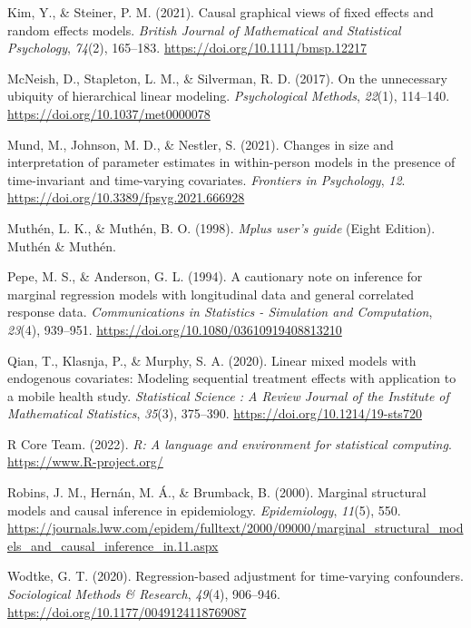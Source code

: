 \documentclass[
  12pt,
  a4paper,
]{article}
\newlength{\cslhangindent}
\newlength{\cslentryspacingunit} %
\newenvironment{CSLReferences}[2] %
 {%
  \setlength{\parindent}{0pt}
  \ifodd #1
  \let\oldpar\par
  \def\par{\hangindent=\cslhangindent\oldpar}
  \fi
  \setlength{\parskip}{#2\cslentryspacingunit}
 }%
 {}
\begin{document}
\begin{CSLReferences}{1}{0}
\leavevmode{}%
Kim, Y., \& Steiner, P. M. (2021). Causal graphical views of fixed
effects and random effects models. \emph{British Journal of Mathematical
and Statistical Psychology}, \emph{74}(2), 165--183.
\url{https://doi.org/10.1111/bmsp.12217}

\leavevmode{}%
McNeish, D., Stapleton, L. M., \& Silverman, R. D. (2017). On the
unnecessary ubiquity of hierarchical linear modeling.
\emph{Psychological Methods}, \emph{22}(1), 114--140.
\url{https://doi.org/10.1037/met0000078}

\leavevmode{}%
Mund, M., Johnson, M. D., \& Nestler, S. (2021). Changes in size and
interpretation of parameter estimates in within-person models in the
presence of time-invariant and time-varying covariates. \emph{Frontiers
in Psychology}, \emph{12}.
\url{https://doi.org/10.3389/fpsyg.2021.666928}

\leavevmode{}%
Muthén, L. K., \& Muthén, B. O. (1998). \emph{Mplus user's guide} (Eight
Edition). Muthén \& Muthén.

\leavevmode{}%
Pepe, M. S., \& Anderson, G. L. (1994). A cautionary note on inference
for marginal regression models with longitudinal data and general
correlated response data. \emph{Communications in Statistics -
Simulation and Computation}, \emph{23}(4), 939--951.
\url{https://doi.org/10.1080/03610919408813210}

\leavevmode{}%
Qian, T., Klasnja, P., \& Murphy, S. A. (2020). Linear mixed models with
endogenous covariates: Modeling sequential treatment effects with
application to a mobile health study. \emph{Statistical Science : A
Review Journal of the Institute of Mathematical Statistics},
\emph{35}(3), 375--390. \url{https://doi.org/10.1214/19-sts720}

\leavevmode{}%
R Core Team. (2022). \emph{R: A language and environment for statistical
computing}. \url{https://www.R-project.org/}

\leavevmode{}%
Robins, J. M., Hernán, M. Á., \& Brumback, B. (2000). Marginal
structural models and causal inference in epidemiology.
\emph{Epidemiology}, \emph{11}(5), 550.
\url{https://journals.lww.com/epidem/fulltext/2000/09000/marginal_structural_models_and_causal_inference_in.11.aspx}

\leavevmode{}%
Wodtke, G. T. (2020). Regression-based adjustment for time-varying
confounders. \emph{Sociological Methods \& Research}, \emph{49}(4),
906--946. \url{https://doi.org/10.1177/0049124118769087}

\end{CSLReferences}
\end{document}

